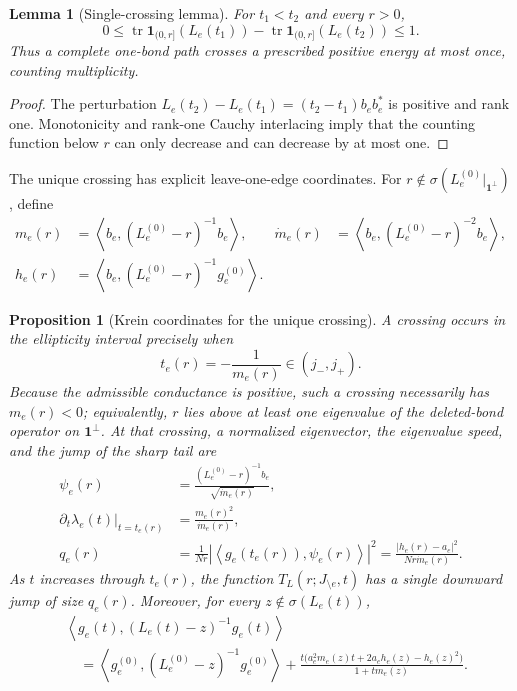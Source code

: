 \documentclass[11pt]{article}
\newtheorem{proposition}[theorem]{Proposition}
\newtheorem{lemma}[theorem]{Lemma}
\theoremstyle{definition}
\theoremstyle{remark}
\newcommand{\tr}{\operatorname{tr}}
\newcommand{\ip}[2]{\left\langle #1,#2\right\rangle}
\newcommand{\abs}[1]{\left\lvert #1\right\rvert}
\begin{document}
\begin{lemma}[Single-crossing lemma]
\label{lem:single-crossing}
For $t_1<t_2$ and every $r>0$,
\begin{equation}
 0\le
 \tr\bm1_{(0,r]}(L_e(t_1))-
 \tr\bm1_{(0,r]}(L_e(t_2))
 \le1.
 \label{eq:single-crossing-count}
\end{equation}
Thus a complete one-bond path crosses a prescribed positive energy at most
once, counting multiplicity.
\end{lemma}

\begin{proof}
The perturbation
$L_e(t_2)-L_e(t_1)=(t_2-t_1)b_eb_e^*$ is positive and rank one.  Monotonicity
and rank-one Cauchy interlacing imply that the counting function below $r$ can
only decrease and can decrease by at most one.
\end{proof}

The unique crossing has explicit leave-one-edge coordinates.  For
$r\notin\sigma(L_e^{(0)}|_{\mathbf1^\perp})$, define
\begin{align}
 m_e(r)&=\ip{b_e}{(L_e^{(0)}-r)^{-1}b_e},
 &
 \dot m_e(r)&=\ip{b_e}{(L_e^{(0)}-r)^{-2}b_e},
 \label{eq:Krein-m-functions}\\
 h_e(r)&=\ip{b_e}{(L_e^{(0)}-r)^{-1}g_e^{(0)}}.
 \label{eq:Krein-h-function}
\end{align}

\begin{proposition}[Krein coordinates for the unique crossing]
\label{prop:Krein-crossing-coordinates}
A crossing occurs in the ellipticity interval precisely when
\begin{equation}
 t_e(r)=-\frac1{m_e(r)}\in(j_-,j_+).
 \label{eq:Krein-crossing-location}
\end{equation}
Because the admissible conductance is positive, such a crossing necessarily has $m_e(r)<0$; equivalently, $r$ lies above at least one eigenvalue of the deleted-bond operator on $\mathbf1^\perp$.
At that crossing, a normalized eigenvector, the eigenvalue speed, and the jump
of the sharp tail are
\begin{align}
 \psi_e(r)
 &=\frac{(L_e^{(0)}-r)^{-1}b_e}{\sqrt{\dot m_e(r)}},
 \label{eq:Krein-crossing-vector}\\
 \left.\partial_t\lambda_e(t)\right|_{t=t_e(r)}
 &=\frac{m_e(r)^2}{\dot m_e(r)},
 \label{eq:Krein-crossing-speed}\\
 q_e(r)
 &=\frac1{Nr}\abs{\ip{g_e(t_e(r))}{\psi_e(r)}}^2
 =\frac{\abs{h_e(r)-a_e}^2}{Nr\dot m_e(r)}.
 \label{eq:Krein-crossing-jump}
\end{align}
As $t$ increases through $t_e(r)$, the function
$T_L(r;J_{\setminus e},t)$ has a single downward jump of size $q_e(r)$.
Moreover, for every $z\notin\sigma(L_e(t))$,
\begin{align}
 &\ip{g_e(t)}{(L_e(t)-z)^{-1}g_e(t)}
 \nonumber\\
 &\quad=
 \ip{g_e^{(0)}}{(L_e^{(0)}-z)^{-1}g_e^{(0)}}
 +\frac{t\bigl(a_e^2m_e(z)t+2a_eh_e(z)-h_e(z)^2\bigr)}
 {1+tm_e(z)}.
 \label{eq:affine-source-Krein-resolvent}
\end{align}
\end{proposition}
\end{document}
